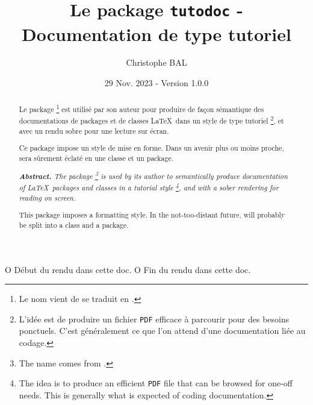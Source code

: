                        { O{ Début du rendu dans cette doc. }
                         O{ Fin du rendu dans cette doc. } }{
        \smallskip
}{
        \smallskip
}





\title{Le package \texttt{tutodoc} - Documentation de type tutoriel}
\author{Christophe BAL}
\date{29 Nov. 2023 - Version 1.0.0}

\maketitle

\begin{abstract}
Le package 
\footnote{
    Le nom vient de  se traduit en .
}
est utilisé par son auteur pour produire de façon sémantique des documentations de packages et de classes \LaTeX\ dans un style de type tutoriel
\footnote{
    L'idée est de produire un fichier \texttt{PDF} efficace à parcourir pour des besoins ponctuels. C'est généralement ce que l'on attend d'une documentation liée au codage.
},
et avec un rendu sobre pour une lecture sur écran.


\begin{tdocnote}
 	Ce package impose un style de mise en forme.
	Dans un avenir plus ou moins proche,  sera sûrement éclaté en une classe et un package.
\end{tdocnote}

\tdocsep

{\small\itshape
\textbf{Abstract.}
The  package
\footnote{
	The name comes from .
}
is used by its author to semantically produce documentation of \LaTeX\ packages and classes in a tutorial style
\footnote{
    The idea is to produce an efficient \texttt{PDF} file that can be browsed for one-off needs. This is generally what is expected of coding documentation.
},
and with a sober rendering for reading on screen.


\begin{tdocnote}
 	This package imposes a formatting style. In the not-too-distant future,  will probably be split into a class and a package.
\end{tdocnote}
}
\end{abstract}


